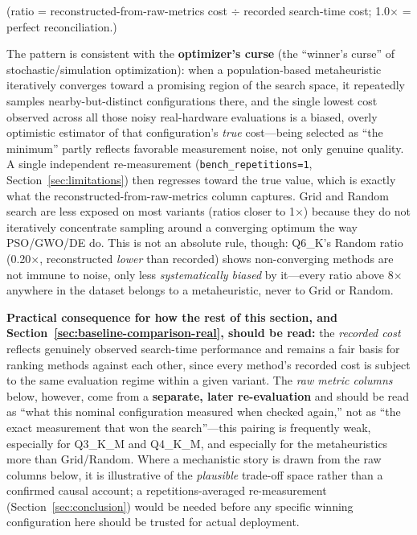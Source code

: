 \documentclass[journal]{IEEEtran}
\begin{document}
(ratio = reconstructed-from-raw-metrics cost $\div$ recorded search-time cost; 1.0$\times$ = perfect reconciliation.)

The pattern is consistent with the \textbf{optimizer's curse} (the ``winner's curse'' of stochastic/simulation optimization): when a population-based metaheuristic iteratively converges toward a promising region of the search space, it repeatedly samples nearby-but-distinct configurations there, and the single lowest cost observed across all those noisy real-hardware evaluations is a biased, overly optimistic estimator of that configuration's \emph{true} cost---being selected as ``the minimum'' partly reflects favorable measurement noise, not only genuine quality. A single independent re-measurement (\texttt{bench\_repetitions=1}, Section~\ref{sec:limitations}) then regresses toward the true value, which is exactly what the reconstructed-from-raw-metrics column captures. Grid and Random search are less exposed on most variants (ratios closer to 1$\times$) because they do not iteratively concentrate sampling around a converging optimum the way PSO/GWO/DE do. This is not an absolute rule, though: Q6\_K's Random ratio (0.20$\times$, reconstructed \emph{lower} than recorded) shows non-converging methods are not immune to noise, only less \emph{systematically biased} by it---every ratio above 8$\times$ anywhere in the dataset belongs to a metaheuristic, never to Grid or Random.

\textbf{Practical consequence for how the rest of this section, and Section~\ref{sec:baseline-comparison-real}, should be read:} the \emph{recorded cost} reflects genuinely observed search-time performance and remains a fair basis for ranking methods against each other, since every method's recorded cost is subject to the same evaluation regime within a given variant. The \emph{raw metric columns} below, however, come from a \textbf{separate, later re-evaluation} and should be read as ``what this nominal configuration measured when checked again,'' not as ``the exact measurement that won the search''---this pairing is frequently weak, especially for Q3\_K\_M and Q4\_K\_M, and especially for the metaheuristics more than Grid/Random. Where a mechanistic story is drawn from the raw columns below, it is illustrative of the \emph{plausible} trade-off space rather than a confirmed causal account; a repetitions-averaged re-measurement (Section~\ref{sec:conclusion}) would be needed before any specific winning configuration here should be trusted for actual deployment.
\end{document}
